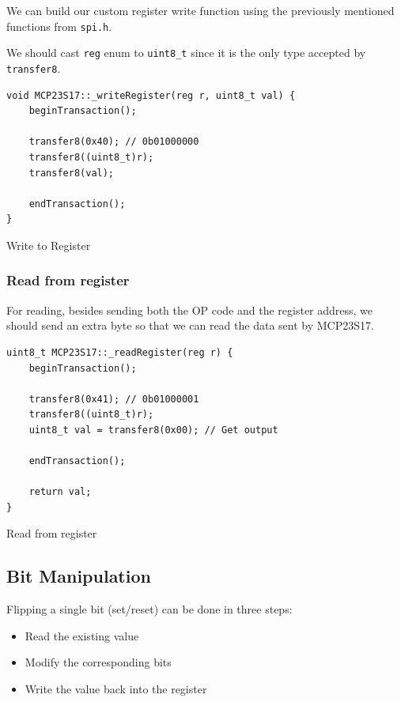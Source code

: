 \documentclass{article}
\begin{document}
We can build our custom register write function using the previously mentioned functions from \verb|spi.h|.

We should cast \verb|reg| enum to \verb|uint8_t| since it is the only type accepted by \verb|transfer8|.


\begin{listing}[H]
\begin{verbatim}
void MCP23S17::_writeRegister(reg r, uint8_t val) {
    beginTransaction();

    transfer8(0x40); // 0b01000000
    transfer8((uint8_t)r);
    transfer8(val);

    endTransaction();
}
\end{verbatim}
\caption{Write to Register}
\end{listing}

\subsubsection{Read from register}

For reading, besides sending both the OP code and the register address, we should send an extra byte so that we can read the data sent by MCP23S17.

\begin{listing}[H]
\begin{verbatim}
uint8_t MCP23S17::_readRegister(reg r) {
    beginTransaction();

    transfer8(0x41); // 0b01000001
    transfer8((uint8_t)r);
    uint8_t val = transfer8(0x00); // Get output

    endTransaction();

    return val;
}
\end{verbatim}
\caption{Read from register}
\end{listing}


\subsection{Bit Manipulation}

Flipping a single bit (set/reset) can be done in three steps:
\begin{itemize}
    \item Read the existing value
    \item Modify the corresponding bits
    \item Write the value back into the register
\end{itemize}
\end{document}
